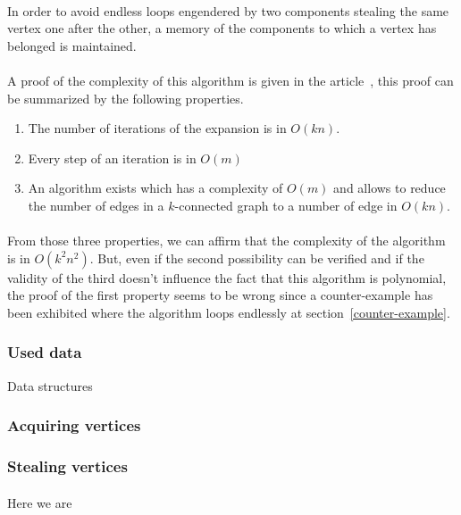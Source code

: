 \paragraph{}
In order to avoid endless loops engendered by two components stealing the same
vertex one after the other, a memory of the components to which a vertex has
belonged is maintained.
\paragraph{}
A proof of the complexity of this algorithm is given in the
article~\cite{JS94}, this proof can be summarized by the following properties.
\begin{enumerate}
\item The number of iterations of the expansion is in $O(kn)$.
\item Every step of an iteration is in $O(m)$
\item An algorithm exists which has a complexity of $O(m)$ and allows to
  reduce the number of edges in a $k$-connected graph to a number of edge in
  $O(kn)$.
\end{enumerate}
\paragraph{}
From those three properties, we can affirm that the complexity of the
algorithm is in $O(k^2n^2)$. But, even if the second possibility can be
verified and if the validity of the third doesn't influence the fact that this
algorithm is polynomial, the proof of the first property seems to be wrong
since a counter-example has been exhibited where the algorithm loops endlessly
at section~\ref{counter-example}.

\subsubsection{Used data}
Data structures

\subsubsection{Acquiring vertices}

\subsubsection{Stealing vertices}

\paragraph{}
Here we are
\\

